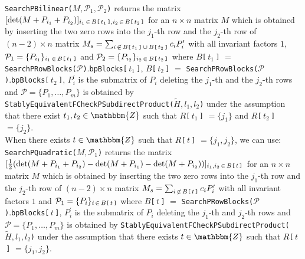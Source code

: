 \documentclass{amsart}
\theoremstyle{plain}
\theoremstyle{definition}
\theoremstyle{remark}
\newcommand{\bZ}{\mathbbm{Z}}\newcommand{\bQ}{\mathbbm{Q}}
\newcounter{sub}\def\tr{\mbox{tr }}
\begin{document}
\noindent 
{\tt SearchPBilinear($M,\mathcal{P}_1,\mathcal{P}_2$)}
returns the matrix 
$[{\rm det}(M+P_{i_1}+P_{i_2})]_{i_1\,\in\,B\mbox{\tt\scriptsize [}\,t_1\,\mbox{\tt\scriptsize ]},i_2\,\in\,B\mbox{\tt\scriptsize [}\,t_2\,\mbox{\tt\scriptsize ]}}$ 
for an $n\times n$ matrix $M$ 
which is obtained by inserting the two zero rows 
into the $j_1$-th row and the $j_2$-th row 
of $(n-2)\times n$ matrix 
$M_s=\sum_{i\,\not\in\,B\mbox{\tt\scriptsize [}\,t_1\,\mbox{\tt\scriptsize ]}
\,\cup\,B\mbox{\tt\scriptsize [}\,t_2\,\mbox{\tt\scriptsize ]}} 
c_i P_i^\prime$ 
with all invariant factors $1$, 
$\mathcal{P}_1=\{P_{i_1}\}_{i_1\,\in\, B\mbox{\tt\scriptsize [}\,t_1\,\mbox{\tt\scriptsize ]}}$ and 
$\mathcal{P}_2=\{P_{i_2}\}_{i_2\,\in\, B\mbox{\tt\scriptsize [}\,t_2\,\mbox{\tt\scriptsize ]}}$ 
where 
$B${\tt [}\,$t_1$\,{\tt ]} $=$ {\tt SearchPRowBlocks($\mathcal{P}$)}.{\tt bpBlocks[}\,$t_1$\,{\tt ]}, 
$B${\tt [}\,$t_2$\,{\tt ]} $=$ {\tt SearchPRowBlocks($\mathcal{P}$)}.{\tt bpBlocks[}\,$t_2$\,{\tt ]}, 
$P_i^\prime$ is the submatrix of $P_i$ 
deleting the $j_1$-th and the $j_2$-th rows 
and 
$\mathcal{P}=\{P_1,\ldots,P_m\}$ is obtained by\\
{\tt StablyEquivalentFCheckPSubdirectProduct($\widetilde{H},l_1,l_2$)} 
under the assumption that 
there exist $t_1, t_2\in\bZ$ such that 
$R${\tt [}\,$t_1$\,{\tt ]} $=\{j_1\}$ and 
$R${\tt [}\,$t_2$\,{\tt ]} $=\{j_2\}$.\\

When there exists $t\in\bZ$ such that 
$R${\tt [}\,$t$\,{\tt ]} $=\{j_1,j_2\}$, 
we can use:\\

\noindent 
{\tt SearchPQuadratic($M,\mathcal{P}_1$)}
returns the matrix 
$[\frac{1}{2}({\rm det}(M+P_{i_1}+P_{i_2})-{\rm det}(M+P_{i_1})-{\rm det}(M+P_{i_2}))]_{i_1,i_2\,\in\,B\mbox{\tt\scriptsize [}\,t\,\mbox{\tt\scriptsize ]}}$ 
for an $n\times n$ matrix $M$ 
which is obtained by inserting the two zero rows 
into the $j_1$-th row and the $j_2$-th row of 
$(n-2)\times n$ matrix 
$M_s=\sum_{i\,\not\in\,B\mbox{\tt\scriptsize [}\,t\,\mbox{\tt\scriptsize ]}} c_i P_i^\prime$ 
with all invariant factors $1$ and 
$\mathcal{P}_1=\{P_i\}_{i\,\in\, B\mbox{\tt\scriptsize [}\,t\,\mbox{\tt\scriptsize ]}}$
where 
$B${\tt [}\,$t$\,{\tt ]} $=$ {\tt SearchPRowBlocks($\mathcal{P}$)}.{\tt bpBlocks[}\,$t$\,{\tt ]}, 
$P_i^\prime$ is the submatrix of $P_i$ 
deleting the $j_1$-th and $j_2$-th rows and 
$\mathcal{P}=\{P_1,\ldots,P_m\}$ is obtained by 
{\tt StablyEquivalentFCheckPSubdirectProduct($\widetilde{H},l_1,l_2$)} 
under the assumption that 
there exists $t\in\bZ$ such that $R${\tt [}\,$t$\,{\tt ]} $=\{j_1,j_2\}$.\\
\end{document}
